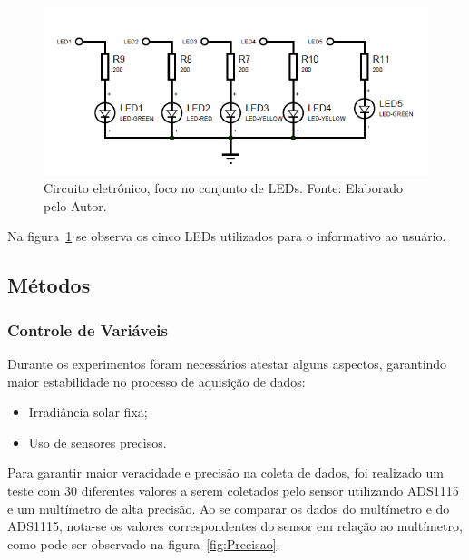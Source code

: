 \begin{figure}[!htbp]
	\centering
	\includegraphics[scale=1.0]{imagens/CircuitoLED.png}
	\caption{Circuito eletrônico, foco no conjunto de LEDs. Fonte: Elaborado pelo Autor. 	}
	\label{fig:CircuitoLED}
\end{figure}
\FloatBarrier

Na figura~\ref{fig:CircuitoLED} se observa os cinco LEDs utilizados para o informativo ao usuário.

\subsection{Métodos}
\subsubsection{Controle de Variáveis}
Durante os experimentos foram necessários atestar alguns aspectos, garantindo maior estabilidade no processo de aquisição de dados:
\begin{itemize}
\item Irradiância solar fixa;
\item Uso de sensores precisos.
\end{itemize}

Para garantir maior veracidade e precisão na coleta de dados, foi realizado um teste com 30 diferentes valores a serem coletados pelo sensor utilizando ADS1115 e um multímetro de alta precisão. Ao se comparar os dados do multímetro e do ADS1115, nota-se os valores correspondentes do sensor em relação ao multímetro, como pode ser observado na figura~\ref{fig:Precisao}.

